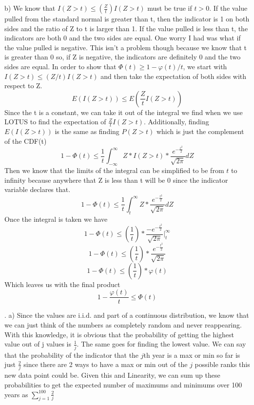 \documentclass[11pt]{article}
\begin{document}
    b) We know that $I(Z>t) \le (\frac{Z}{t})I(Z>t)$ must be true if $t > 0$. If the value pulled from the standard normal is greater than t, then the indicator is 1 on both sides and the ratio of Z to t is larger than 1.  If the value pulled is less than t, the indicators are both 0 and the two sides are equal.  One worry I had was what if the value pulled is negative.  This isn't a problem though because we know that t is greater than 0 so, if Z is negative, the indicators are definitely 0 and the two sides are equal. 
    In order to show that $\Phi(t) \ge 1 - \varphi(t)/t$, we start with $I(Z>t) \leq (Z/t)I(Z>t)$ and then take the expectation of both sides with respect to Z.
    $$ E(I(Z>t)) \le E(\frac{Z}{t}I(Z>t))$$
    Since the t is a constant, we can take it out of the integral we find when we use LOTUS to find the expectation of $\frac{Z}{t}I(Z>t)$.  Additionally, finding $E(I(Z>t))$ is the same as finding $P(Z>t)$ which is just the complement of the CDF(t)
    $$ 1 - \Phi(t) \le \frac{1}{t}\int^{\infty}_{-\infty}Z*I(Z>t)*\frac{e^{-\frac{z^2}{2}}}{\sqrt{2\pi}}dZ$$
    Then we know that the limits of the integral can be simplified to be from $t$ to infinity because anywhere that Z is less than t will be 0 since the indicator variable declares that. 
    $$ 1 - \Phi(t) \le \frac{1}{t}\int^{\infty}_{t}Z*\frac{e^{-\frac{z^2}{2}}}{\sqrt{2\pi}}dZ$$
    Once the integral is taken we have
    $$ 1 - \Phi(t) \le (\frac{1}{t})*\frac{-e^{-\frac{z^2}{2}}}{\sqrt{2\pi}}\Big|^\infty_t$$
    $$ 1 - \Phi(t) \le (\frac{1}{t})*\frac{e^{-\frac{t^2}{2}}}{\sqrt{2\pi}}$$
    $$ 1 - \Phi(t) \le (\frac{1}{t})*\varphi(t)$$
    Which leaves us with the final product
    $$ 1 - \frac{\varphi(t)}{t} \le \Phi(t)$$

\bigskip

.
\smallskip	
	a) Since the values are i.i.d. and part of a continuous distribution, we know that we can just think of the numbers as completely random and never reappearing.  With this knowledge, it is obvious that the probability of getting the highest value out of j values is $\frac{1}{j}$.  The same goes for finding the lowest value.  We can say that the probability of the indicator that the $j$th year is a max or min so far is just $\frac{2}{j}$ since there are 2 ways to have a max or min out of the $j$ possible ranks this new data point could be.  Given this and Linearity, we can sum up these probabilities to get the expected number of maximums and minimums over 100 years as $\boxed{\sum^{100}_{j=1} \frac{2}{j}}$
\smallskip
\end{document}
